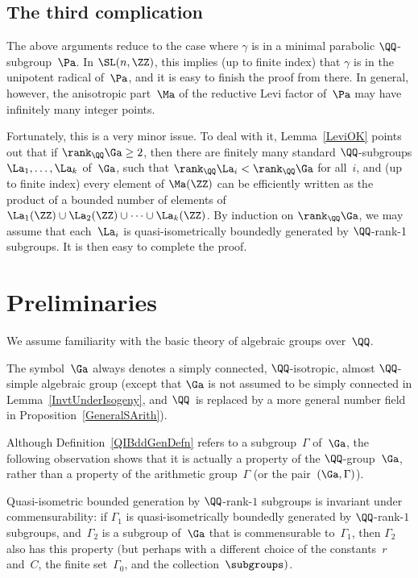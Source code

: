 \subsection*{The third complication}
The above arguments reduce to the case where $\gamma$ is in a minimal parabolic $\QQ$-subgroup~$\Pa$. In $\SL(n,\ZZ)$, this implies (up to finite index) that $\gamma$ is in the unipotent radical of~$\Pa$, and it is easy to finish the proof from there. In general, however, the anisotropic part~$\Ma$ of the reductive Levi factor of~$\Pa$ may have infinitely many integer points.

Fortunately, this is a very minor issue. To deal with it, Lemma~\ref{LeviOK} points out that if $\rank_\QQ \Ga \ge 2$, then there are finitely many standard $\QQ$-subgroups $\La_1,\ldots,\La_k$ of~$\Ga$, such that $\rank_\QQ \La_i < \rank_\QQ \Ga$ for all~$i$, and (up to finite index) every element of $\Ma(\ZZ)$ can be efficiently written as the product of a bounded number of elements of $\La_1(\ZZ) \cup \La_2(\ZZ) \cup\cdots \cup \La_k(\ZZ)$. By induction on $\rank_\QQ \Ga$, we may assume that each~$\La_i$ is quasi-isometrically boundedly generated by $\QQ$-rank-1 subgroups. It is then easy to complete the proof.

\section{Preliminaries}

 We assume familiarity with the basic theory of algebraic groups over~$\QQ$.

 \begin{notation} \label{GaNotation} The symbol~$\Ga$ always denotes a simply connected, $\QQ$-isotropic, almost $\QQ$-simple algebraic group (except that $\Ga$ is not assumed to be simply connected in Lemma~\ref{InvtUnderIsogeny}, and $\QQ$~is replaced by a more general number field in Proposition~\ref{GeneralSArith}).
 \end{notation}

Although Definition~\ref{QIBddGenDefn} refers to a subgroup~$\Gamma$ of~$\Ga$, the following observation shows that it is actually a property of the $\QQ$-group~$\Ga$, rather than a property of the arithmetic group~$\Gamma$ (or the pair~$(\Ga,\Gamma)$).

\begin{lem} \label{BddCommensurable}\sloppy
Quasi-isometric bounded generation by $\QQ$-rank-$1$ subgroups is invariant under commensurability:
if $\Gamma_1$ is quasi-isometrically boundedly generated by $\QQ$-rank-$1$ subgroups, and~$\Gamma_2$ is a subgroup of~$\Ga$ that is commensurable to~$\Gamma_1$, then $\Gamma_2$ also has this property $($but perhaps with a different choice of the constants~$r$ and~$C$, the finite set~$\Gamma_0$, and the collection~$\subgroups)$.
\end{lem}

